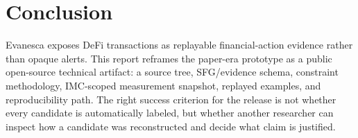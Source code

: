 \documentclass[10pt]{article}
\newcommand{\sys}{Evanesca\xspace}
\begin{document}
\section{Conclusion}
\label{sec:conclusion}

\sys exposes DeFi transactions as replayable financial-action evidence rather
than opaque alerts. This report reframes the paper-era prototype as a public
open-source technical artifact: a source tree, SFG/evidence schema, constraint
methodology, IMC-scoped measurement snapshot, replayed examples, and
reproducibility path. The right success criterion for the release is not
whether every candidate is automatically labeled, but whether another
researcher can inspect how a candidate was reconstructed and decide what claim
is justified.



\end{document}
